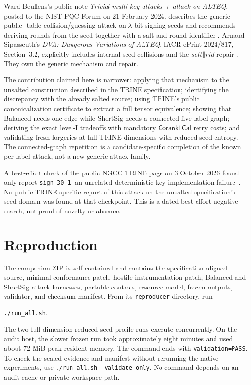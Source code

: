 \documentclass[11pt,a4paper]{article}
\newcommand{\Corank}{\mathsf{Corank1Cal}}
\begin{document}
Ward Beullens's public note \emph{Trivial multi-key attacks + attack on ALTEQ},
posted to the NIST PQC Forum on 21 February 2024, describes the generic public-
table collision/guessing attack on $\lambda$-bit signing seeds and recommends
deriving rounds from the seed together with a salt and round identifier
\cite{beullens2024}.  Arnaud Sipasseuth's \emph{DVA: Dangerous Variations of
ALTEQ}, IACR ePrint 2024/817, Section~3.2, explicitly includes internal seed
collisions and the $\mathit{salt}\mathbin\Vert\mathit{rid}$ repair
\cite{sipasseuth2024}.  They own the generic mechanism and repair.

The contribution claimed here is narrower: applying that mechanism to the
unsalted construction described in the TRINE specification; identifying the
discrepancy with the already salted source;
using TRINE's public canonicalization certificate to extract a full tensor
equivalence; showing that Balanced needs one edge while ShortSig needs a
connected five-label graph; deriving the exact level-I tradeoffs with mandatory
$\Corank$ retry costs; and validating fresh forgeries at full TRINE dimensions
with reduced seed entropy.  The connected-graph repetition is a
candidate-specific completion of the known per-label attack, not a new generic
attack family.

A best-effort check of the public NGCC TRINE page on 3 October 2026 found only
report \texttt{sign-30-1}, an unrelated deterministic-key implementation
failure~\cite{ngcc-trine}.  No public TRINE-specific report of this attack on
the unsalted specification's seed domain was found at that checkpoint.  This
is a dated best-effort negative search, not proof of novelty or absence.

\section{Reproduction}

The companion ZIP is self-contained and contains the specification-aligned source,
minimal conformance patch, hostile instrumentation patch, Balanced and ShortSig
attack harnesses, portable controls, resource model, frozen outputs, validator,
and checksum manifest.  From its \texttt{reproducer} directory, run
\begin{center}
                 \texttt{./run\_all.sh}.
\end{center}
The two full-dimension reduced-seed profile runs execute concurrently.  On the
audit host, the slower frozen run took approximately eight minutes and used
about 72 MiB peak resident memory.  The command ends with
\texttt{validation=PASS}.  To check the sealed evidence and manifest without
rerunning the native experiments, use
\texttt{./run\_all.sh --validate-only}.  No command depends on an audit-cache or
private workspace path.
\end{document}
